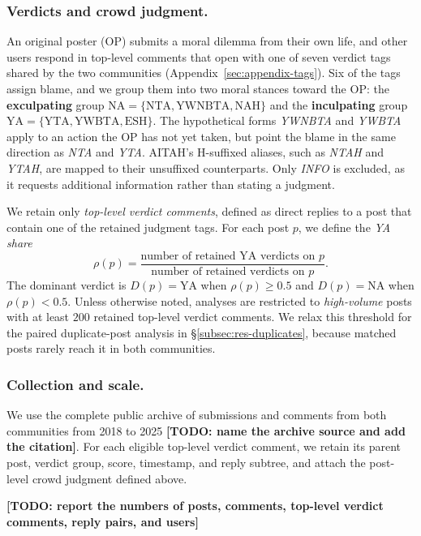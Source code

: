 \subsubsection{Verdicts and crowd judgment.}
An original poster (OP) submits a moral dilemma from their own life, and other
users respond in top-level comments that open with one of seven verdict tags
shared by the two communities (Appendix~\ref{sec:appendix-tags}). Six of the
tags assign blame, and we group them into two moral stances toward the OP: the
\textbf{exculpating} group
$\mathrm{NA}=\{\text{NTA},\text{YWNBTA},\text{NAH}\}$ and the
\textbf{inculpating} group
$\mathrm{YA}=\{\text{YTA},\text{YWBTA},\text{ESH}\}$. The hypothetical forms
\emph{YWNBTA} and \emph{YWBTA} apply to an action the OP has not yet taken, but
point the blame in the same direction as \emph{NTA} and \emph{YTA}. AITAH's
H-suffixed aliases, such as \emph{NTAH} and \emph{YTAH}, are mapped to their
unsuffixed counterparts. Only \emph{INFO} is excluded, as it requests
additional information rather than stating a judgment.

We retain only \emph{top-level verdict comments}, defined as direct replies to
a post that contain one of the retained judgment tags. For each post $p$,
we define the \emph{YA share}
\[
\rho(p)=\frac{\text{number of retained YA verdicts on }p}
{\text{number of retained verdicts on }p}.
\]
The dominant verdict is $D(p)=\mathrm{YA}$ when $\rho(p)\ge0.5$ and
$D(p)=\mathrm{NA}$ when $\rho(p)<0.5$.
Unless otherwise noted, analyses are restricted to \emph{high-volume} posts
with at least $200$ retained top-level verdict comments. We relax this
threshold for the paired duplicate-post analysis in
\S\ref{subsec:res-duplicates}, because matched posts rarely reach it in both
communities.

\subsubsection{Collection and scale.}
We use the complete public archive of submissions and comments from both
communities from 2018 to 2025
\textbf{[TODO: name the archive source and add the citation]}.
For each eligible top-level verdict
comment, we retain its parent post, verdict group, score, timestamp, and reply
subtree, and attach the post-level crowd judgment defined above.

\textbf{[TODO: report the numbers of posts, comments, top-level verdict
comments, reply pairs, and users]}

